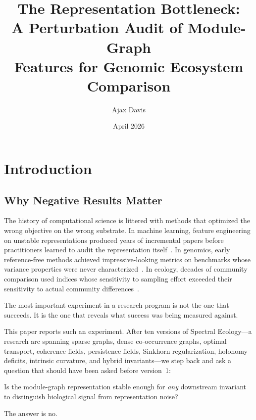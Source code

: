\documentclass{../yalumba}
\title{The Representation Bottleneck:\\A Perturbation Audit of Module-Graph\\Features for Genomic Ecosystem Comparison}
\author{Ajax Davis}
\date{April 2026}
\begin{document}
\maketitle

\tableofcontents
\newpage


\section{Introduction}
\label{sec:intro}

\subsection{Why Negative Results Matter}

The history of computational science is littered with methods that
optimized the wrong objective on the wrong substrate.  In machine
learning, feature engineering on unstable representations produced years
of incremental papers before practitioners learned to audit the
representation itself~\cite{bendavid2006stability}.  In genomics, early
reference-free methods achieved impressive-looking metrics on benchmarks
whose variance properties were never characterized~\cite{fan2021reference}.
In ecology, decades of community comparison used indices whose sensitivity
to sampling effort exceeded their sensitivity to actual community
differences~\cite{bray1957, morisita1959}.

\begin{pullquote}
The most important experiment in a research program is not the one that
succeeds.  It is the one that reveals what success was being measured
against.
\end{pullquote}

This paper reports such an experiment.  After ten versions of Spectral
Ecology---a research arc spanning sparse graphs, dense co-occurrence
graphs, optimal transport, coherence fields, persistence fields,
Sinkhorn regularization, holonomy deficits, intrinsic curvature, and
hybrid invariants---we step back and ask a question that should have been
asked before version~1:

\begin{keyfinding}
Is the module-graph representation stable enough for \emph{any}
downstream invariant to distinguish biological signal from
representation noise?
\end{keyfinding}

The answer is no.
\end{document}
